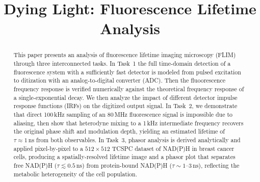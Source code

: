 \documentclass[conference]{IEEEtran}
\begin{document}
\title{Dying Light: Fluorescence Lifetime Analysis\\
}

\author{
\and
{}
\and
{}
}

\maketitle

\begin{abstract}
This paper presents an analysis of fluorescence
lifetime imaging microscopy (FLIM) through three interconnected tasks.
In Task~1 the full time-domain detection of a fluorescence system with
a sufficiently fast detector is modeled from pulsed excitation to 
ditization with an analog-to-digital converter (ADC). Then the fluoorescence frequency response
is verified numerically against the theoretical frequency response of a
single-exponential decay. We then analyze the impact of different
detector impulse response functions (IRFs) on the digitized output 
signal. In Task~2, we demonstrate that direct 100\,kHz sampling of an
80\,MHz fluorescence signal is impossible due to aliasing, then show
that heterodyne mixing to a 1\,kHz intermediate frequency recovers
the original phase shift and modulation depth, yielding an estimated
lifetime of $\tau \approx 1\,\text{ns}$ from both observables.
In Task~3, phasor analysis is derived analytically and applied
pixel-by-pixel to a $512\times512$ TCSPC dataset of NAD(P)H in breast
cancer cells, producing a spatially-resolved lifetime image and a phasor
plot that separates free NAD(P)H ($\tau \lesssim 0.5\,\text{ns}$) from
protein-bound NAD(P)H ($\tau \sim 1$--$3\,\text{ns}$), reflecting the
metabolic heterogeneity of the cell population.
\end{abstract}
\end{document}
